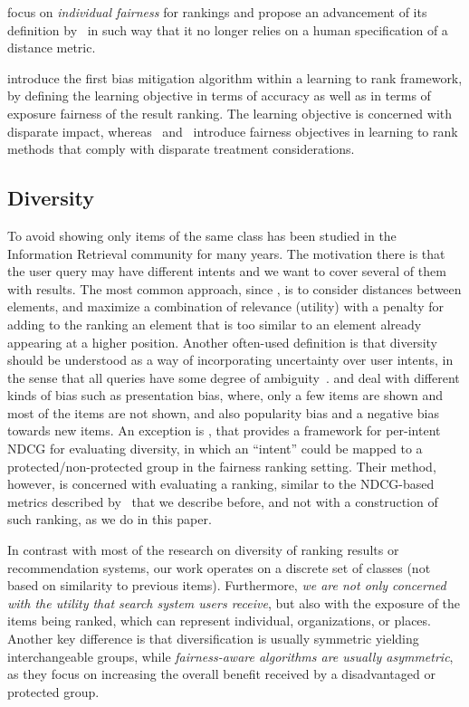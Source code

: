 \citet{lahoti2019operationalizing} focus on \emph{individual fairness} for rankings and propose an advancement of its definition by~\citet{Dwork2012} in such way that it no longer relies on a human specification of a distance metric.

\citet{zehlike2018reducing} introduce the first bias mitigation algorithm within a learning to rank framework, by defining the learning objective in terms of accuracy as well as in terms of exposure fairness of the result ranking.
%
The learning objective is concerned with disparate impact, whereas~\citet{beutel2019fairness} and~\citet{singh2019policy} introduce fairness objectives in learning to rank methods that comply with disparate treatment considerations.


\subsection{Diversity}

To avoid showing only items of the same class has been studied in the Information Retrieval community for many years. The motivation there is that the user query may have different intents and we want to cover several of them with results.
%
The most common approach, since \citet{carbonell1998use}, is to consider distances between elements, and maximize a combination of relevance (utility) with a penalty for adding to the ranking an element that is too similar to an element already appearing at a higher position.
%
Another often-used definition is that diversity should be understood as a way of incorporating uncertainty over user intents, in the sense that all queries have some degree of ambiguity~\cite{agrawal2009diversifying}.
%
\citet{kunaver2017diversity} and \citet{channamsetty2017recommender} deal with different kinds of bias such as presentation bias, where, only a few items are shown and most of the items are not shown, and also popularity bias and a negative bias towards new items.
%
An exception is \citet{sakai2011evaluating}, that provides a framework for per-intent NDCG for evaluating diversity, in which an ``intent'' could be mapped to a protected/non-protected group in the fairness ranking setting. Their method, however, is concerned with evaluating a ranking, similar to the NDCG-based metrics described by~\citet{yang2016measuring} that we describe before, and not with a construction of such ranking, as we do in this paper.

In contrast with most of the research on diversity of ranking results or recommendation systems, our work operates on a discrete set of classes (not based on similarity to previous items).
%
Furthermore, \emph{we are not only concerned with the utility that search system users receive}, but also with the exposure of the items being ranked, which can represent individual, organizations, or places.
%
Another key difference is that diversification is usually symmetric yielding interchangeable groups, while \emph{fairness-aware algorithms are usually asymmetric}, as they focus on increasing the overall benefit received by a disadvantaged or protected group.
